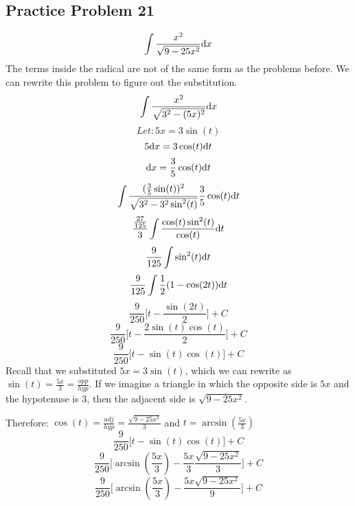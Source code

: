 \documentclass[letterpaper, 12pt]{math}
\begin{document}
\subsection*{Practice Problem 21}
\[ \int{\frac{x^{2}}{\sqrt{9-25x^{2}}}\mathrm{d}{x}} \]
The terms inside the radical are not of the same form as the problems
before. We can rewrite this problem to figure out the substitution.
\[ \int{\frac{x^{2}}{\sqrt{3^{2}-(5x)^{2}}}\mathrm{d}{x}} \]
\[ Let: 5x = 3\sin(t) \]
\[ 5\mathrm{d}{x} = 3\cos(t)\mathrm{d}{t} \]
\[ \mathrm{d}{x} = \frac{3}{5}\cos(t)\mathrm{d}{t} \]
\[ \int{\frac{(\frac{3}{5}\sin(t))^{2}}{\sqrt{3^{2}-3^{2}\sin^{2}(t)}}
   \frac{3}{5}\cos(t)\mathrm{d}{t}} \]
\[ \frac{\frac{27}{125}}{3}
   \int{\frac{\cos(t)\sin^{2}(t)}{\cos(t)}\mathrm{d}{t}} \]
\[ \frac{9}{125}\int{\sin^{2}(t)\mathrm{d}{t}} \]
\[ \frac{9}{125}\int{\frac{1}{2}(1-\cos(2t))\mathrm{d}{t}} \]
\[ \frac{9}{250}\bigg[t-\frac{\sin(2t)}{2}\bigg]+C \]
\[ \frac{9}{250}\bigg[t-\frac{2\sin(t)\cos(t)}{2}\bigg]+C \]
\[ \frac{9}{250}\bigg[t-\sin(t)\cos(t)\bigg]+C \]
Recall that we substituted \( 5x = 3\sin(t) \), which we can rewrite as
\( \sin(t) = \frac{5x}{3} = \frac{opp}{hyp} \). If we imagine a triangle
in which the opposite side is \( 5x \) and the hypotenuse is 3, then the
adjacent side is \( \sqrt{9-25x^{2}} \).
\begin{center}
\end{center}
Therefore: \( \cos(t) = \frac{adj}{hyp} = \frac{\sqrt{9-25x^{2}}}{3} \)
and \( t = \arcsin(\frac{5x}{3}) \)
\[ \frac{9}{250}\bigg[t-\sin(t)\cos(t)\bigg]+C \]
\[ \frac{9}{250}\bigg[\arcsin(\frac{5x}{3})-
   \frac{5x}{3}\frac{\sqrt{9-25x^{2}}}{3}\bigg]+C \]
\[ \frac{9}{250}\bigg[\arcsin(\frac{5x}{3})-
   \frac{5x\sqrt{9-25x^{2}}}{9}\bigg]+C \]
\end{document}
